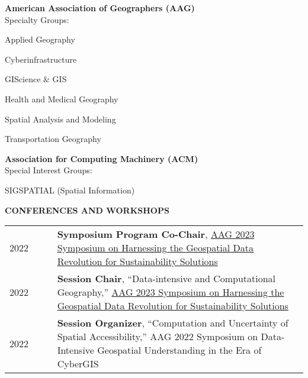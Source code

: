 \documentclass{acmcv}
\begin{document}

    \textbf{American Association of Geographers (AAG)} \\
    Specialty Groups: \\ \vspace{-.3cm}
    \begin{multicols}{2}
    \begin{titemize}
        \item Applied Geography
        \item Cyberinfrastructure
        \item GIScience \& GIS
        \item Health and Medical Geography
        \item Spatial Analysis and Modeling
        \item Transportation Geography
    \end{titemize}
    \end{multicols}

    \textbf{Association for Computing Machinery (ACM)} \\
    Special Interest Groups: \\ 
    \begin{titemize}
        \item SIGSPATIAL (Spatial Information)
    \end{titemize}

\pagebreak


    \textbf{\uppercase{Conferences and Workshops}}
    \begin{longtable}{p{0.16\linewidth} p{0.84\linewidth}}
        2022 & \textbf{Symposium Program Co-Chair}, \href{https://iguide.illinois.edu/aag-2023-symposium-on-harnessing-the-geospatial-data-revolution-for-sustainability-solutions/}{AAG 2023 Symposium on Harnessing the Geospatial Data Revolution for Sustainability Solutions}\\

        2022 & \textbf{Session Chair}, ``Data-intensive and Computational Geography,'' \href{https://iguide.illinois.edu/aag-2023-symposium-on-harnessing-the-geospatial-data-revolution-for-sustainability-solutions/}{AAG 2023 Symposium on Harnessing the Geospatial Data Revolution for Sustainability Solutions}\\

        2022 & \textbf{Session Organizer}, ``Computation and Uncertainty of Spatial Accessibility,'' AAG 2022 Symposium on Data-Intensive Geospatial Understanding in the Era of CyberGIS\\
    \end{longtable}
\end{document}
